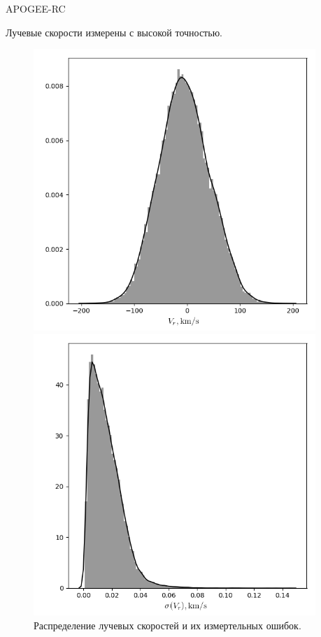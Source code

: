 \documentclass{beamer}
\begin{document}
\begin{frame}{APOGEE-RC}

Лучевые скорости измерены с высокой точностью.

\begin{figure}[h!]
\begin{minipage}[h]{0.49\linewidth}
        \includegraphics[width=0.95\textwidth]{../imgs/vr_distr.png}
\end{minipage}
\hfill
\begin{minipage}[h]{0.49\linewidth}
        \includegraphics[width=0.95\textwidth]{../imgs/vr_err_distr.png}
\end{minipage}
\caption{Распределение лучевых скоростей и их измертельных ошибок.}
\end{figure}
\end{frame}
\end{document}
